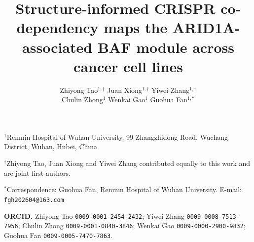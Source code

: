 \documentclass[11pt,a4paper]{article}
\title{\bfseries Structure-informed CRISPR co-dependency maps the
ARID1A-associated BAF module across cancer cell lines}
\author{%
  Zhiyong Tao$^{1,\dagger}$ \quad
  Juan Xiong$^{1,\dagger}$ \quad
  Yiwei Zhang$^{1,\dagger}$ \\[0.35em]
  Chulin Zhong$^{1}$ \quad
  Wenkai Gao$^{1}$ \quad
  Guohua Fan$^{1,*}$%
}
\date{}
\begin{document}
\maketitle

\begin{center}
\small
$^{1}$Renmin Hospital of Wuhan University, 99 Zhangzhidong Road,
Wuchang District, Wuhan, Hubei, China

\medskip
\begin{minipage}{0.92\textwidth}
\footnotesize{}
\noindent $^{\dagger}$Zhiyong Tao, Juan Xiong and Yiwei Zhang contributed equally
to this work and are joint first authors.

\noindent $^{*}$Correspondence: Guohua Fan, Renmin Hospital of Wuhan University.
E-mail: \texttt{fgh202604@163.com}

\smallskip
\noindent \textbf{ORCID.}
Zhiyong Tao \texttt{0009-0001-2454-2432};
Yiwei Zhang \texttt{0009-0008-7513-7956};
Chulin Zhong \texttt{0009-0001-0840-3846};
Wenkai Gao \texttt{0009-0000-2900-9832};
Guohua Fan \texttt{0009-0005-7470-7863}.
\end{minipage}
\end{center}
\end{document}
